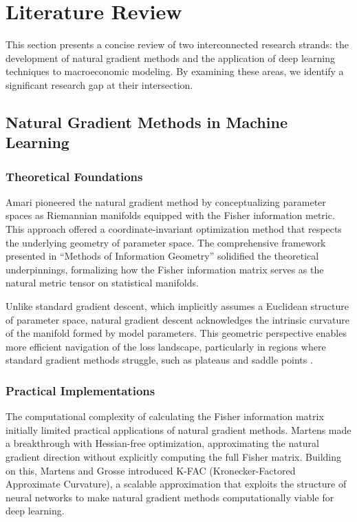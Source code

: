 \documentclass[a4paper]{article}
\begin{document}
\section{Literature Review}

This section presents a concise review of two interconnected research strands: the development of natural gradient methods and the application of deep learning techniques to macroeconomic modeling. By examining these areas, we identify a significant research gap at their intersection.

\subsection{Natural Gradient Methods in Machine Learning}

\subsubsection{Theoretical Foundations}
Amari \cite{amari1998natural} pioneered the natural gradient method by conceptualizing parameter spaces as Riemannian manifolds equipped with the Fisher information metric. This approach offered a coordinate-invariant optimization method that respects the underlying geometry of parameter space. The comprehensive framework presented in ``Methods of Information Geometry'' \cite{amari2000methods} solidified the theoretical underpinnings, formalizing how the Fisher information matrix serves as the natural metric tensor on statistical manifolds.

Unlike standard gradient descent, which implicitly assumes a Euclidean structure of parameter space, natural gradient descent acknowledges the intrinsic curvature of the manifold formed by model parameters. This geometric perspective enables more efficient navigation of the loss landscape, particularly in regions where standard gradient methods struggle, such as plateaus and saddle points \cite{yang1998complexity}.

\subsubsection{Practical Implementations}
The computational complexity of calculating the Fisher information matrix initially limited practical applications of natural gradient methods. Martens \cite{martens2010deep} made a breakthrough with Hessian-free optimization, approximating the natural gradient direction without explicitly computing the full Fisher matrix. Building on this, Martens and Grosse \cite{martens2015optimizing} introduced K-FAC (Kronecker-Factored Approximate Curvature), a scalable approximation that exploits the structure of neural networks to make natural gradient methods computationally viable for deep learning.
\end{document}
